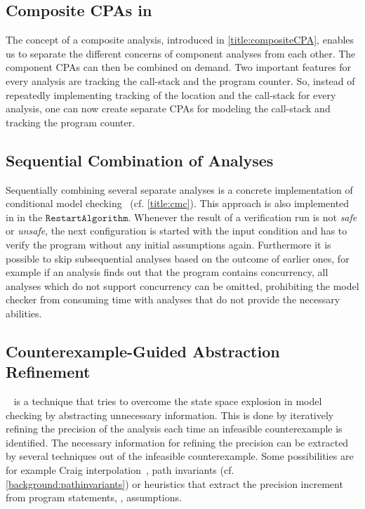 \subsection{Composite CPAs in \CPAchecker{}}
The concept of a composite analysis, introduced in \autoref{title:compositeCPA}, 
enables us to separate the different concerns of component analyses from each other. The component \acp{CPA} can then be combined on demand. Two important features for every analysis are tracking the call-stack and the program counter. So, instead of repeatedly implementing tracking of the location and the call-stack for every analysis, one can now create separate \acp{CPA} for modeling the call-stack and tracking the program counter.

\subsection{Sequential Combination of Analyses}\label{title:restart}
Sequentially combining several separate analyses is a concrete implementation of conditional model checking~\cite{Beyer:ConditionalModelChecking} (cf. \autoref{title:cmc}).
This approach is also implemented in \CPAchecker{} in the $\mathtt{RestartAlgorithm}$. Whenever the result of a verification run is not \emph{safe} or \emph{unsafe}, the next configuration is started with the input condition \false{} and has to verify the program without any initial assumptions again. Furthermore it is possible to skip subsequential analyses based on the outcome of earlier ones, for example if an analysis finds out that the program contains concurrency, all analyses which do not support concurrency can be omitted, prohibiting the model checker from consuming time with analyses that do not provide the necessary abilities.


\subsection{Counterexample-Guided Abstraction Refinement}\label{title:cegar}
~\cite{Clarke:CEGAR} is a technique that tries to overcome the state space explosion in model checking by abstracting unnecessary information. This is done by iteratively refining the precision of the analysis each time an infeasible counterexample is identified. The necessary information for refining the precision can be extracted by several techniques out of the infeasible counterexample. Some possibilities are for example Craig interpolation~\cite{Beyer:CPAchecker}, path invariants (cf. \autoref{background:pathinvariants}) or heuristics that extract the precision increment from program statements, \eg, assumptions.

